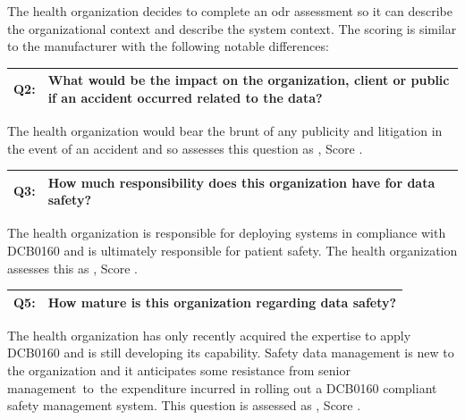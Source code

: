 The health organization decides to complete an \gls{odr} assessment
so it can describe the organizational context and describe the system context. The scoring is similar to the manufacturer with the following notable differences:

\addtocounter{table}{-1} %
\begin{longtable*}[H]
	{|L{}|L{}|}
	\hline
	Q2: & What would be the impact on the organization, client or public if an accident occurred related to the data?\\
	\hline
\end{longtable*}

The health organization would bear the brunt of any publicity and litigation in the event of an accident and so assesses this question as , Score .

\addtocounter{table}{-1} %
\begin{longtable*}[H]
	{|L{}|L{}|}
	\hline
	Q3: & How much responsibility does this organization have for data safety?\\
	\hline
\end{longtable*}

The health organization is responsible for deploying systems in compliance with
DCB0160 \cite{citation:dcb0160clinical}
and is ultimately responsible for patient safety. The health organization assesses this as , Score .

\addtocounter{table}{-1} %
\begin{longtable*}[H]
	{|L{}|L{}|}
	\hline
	Q5: & How mature is this organization regarding data safety?\\
	\hline
\end{longtable*}

The health organization has only recently acquired the expertise to apply
DCB0160
and is still developing its capability. Safety data management is new to the organization and it anticipates some resistance from senior management\cbstart\ to\cbend\ the expenditure incurred in rolling out a DCB0160 compliant safety management system. This question is assessed as , Score .

